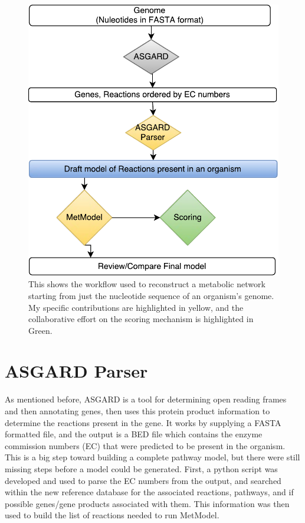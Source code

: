 \begin{figure}[h]
\centering
\includegraphics{Figures/Pipeline}
\decoRule
\caption[Pipeline Workflow]{This shows the workflow used to reconstruct a metabolic network starting from just the nucleotide sequence of an organism's genome. My specific contributions are highlighted in yellow, and the collaborative effort on the scoring mechanism is highlighted in Green.}
\label{fig:Pipeline}
\end{figure}

\section{ASGARD Parser}

\indent As mentioned before, ASGARD is a tool for determining open reading frames and then annotating genes, then uses this protein product information to determine the reactions present in the gene.  It works by supplying a FASTA formatted file, and the output is a BED file which contains the enzyme commission numbers (EC) that were predicted to be present in the organism.  This is a big step toward building a complete pathway model, but there were still missing steps before a model could be generated.  First, a python script was developed and used to parse the EC numbers from the output, and searched within the new reference database for the associated reactions, pathways, and if possible genes/gene products associated with them.  This information was then used to build the list of reactions needed to run MetModel.\\

